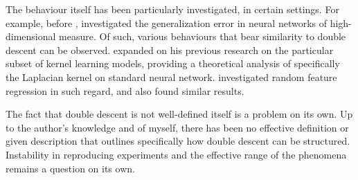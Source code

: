 \documentclass[10pt]{article} %
\begin{document}
The behaviour itself has been particularly investigated, in certain settings. For example, before \cite{belkin_reconciling_2019}, \cite{advani2017highdimensionaldynamicsgeneralizationerror} investigated the generalization error in neural networks of high-dimensional measure. Of such, various behaviours that bear similarity to double descent can be observed. \cite{belkin2018understanddeeplearningneed} expanded on his previous research on the particular subset of kernel learning models, providing a theoretical analysis of specifically the Laplacian kernel on standard neural network. \cite{mei2020generalizationerrorrandomfeatures} investigated random feature regression in such regard, and also found similar results. 

The fact that double descent is not well-defined itself is a problem on its own. Up to the author's knowledge and of myself, there has been no effective definition or given description that outlines specifically how double descent can be structured. Instability in reproducing experiments and the effective range of the phenomena remains a question on its own. 
\end{document}
